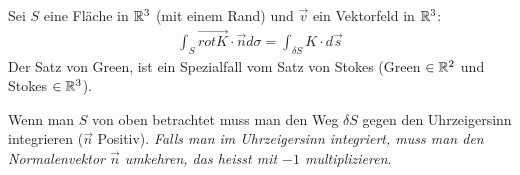 \documentclass[a4paper]{article}
\begin{document}
		\begin{fsatz}
			Sei $S$ eine Fläche in $\mathbb{R}^3$ (mit einem Rand) und $\vec v$ ein Vektorfeld in $\mathbb{R}^3$:
			\begin{align*}
				\int_S \overrightarrow{ rot K} \cdot \vec n d\sigma  = \int_{\delta S} K \cdot d \vec s
			\end{align*}
			Der Satz von Green, ist ein Spezialfall vom Satz von Stokes (Green $\in \mathbb{R}^2$ und Stokes $\in \mathbb{R}^3$). 
			
			Wenn man $S$ von oben betrachtet muss man den Weg $\delta S$ gegen den Uhrzeigersinn integrieren ($\vec n$ Positiv). \emph{Falls man im Uhrzeigersinn integriert, muss man den Normalenvektor $\vec n$ umkehren, das heisst mit $-1$ multiplizieren}.

		\end{fsatz}
% 
\end{document}
